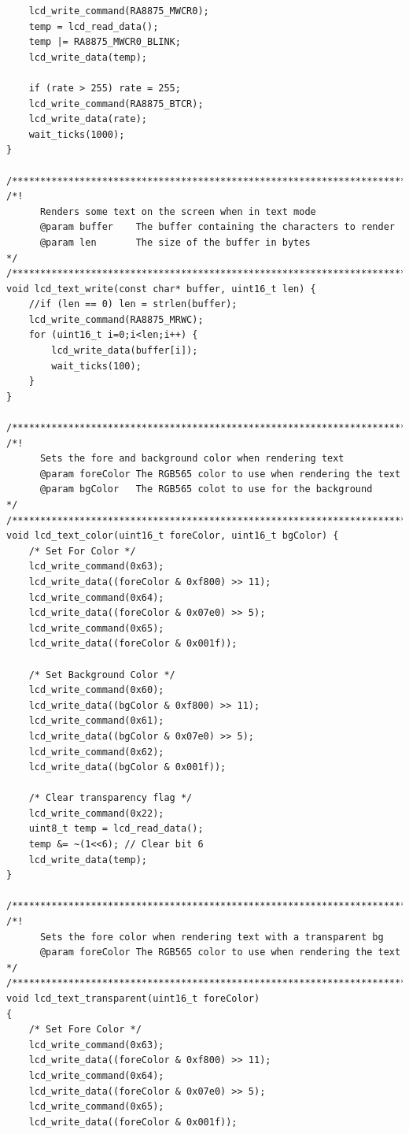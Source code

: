 \documentclass[a4paper, 12pt]{article}
\begin{document}
\begin{verbatim}
	lcd_write_command(RA8875_MWCR0);
	temp = lcd_read_data();
	temp |= RA8875_MWCR0_BLINK;
	lcd_write_data(temp);

	if (rate > 255) rate = 255;
	lcd_write_command(RA8875_BTCR);
	lcd_write_data(rate);
	wait_ticks(1000);
}

/**************************************************************************/
/*!
      Renders some text on the screen when in text mode
      @param buffer    The buffer containing the characters to render
      @param len       The size of the buffer in bytes
*/
/**************************************************************************/
void lcd_text_write(const char* buffer, uint16_t len) {
	//if (len == 0) len = strlen(buffer);
	lcd_write_command(RA8875_MRWC);
	for (uint16_t i=0;i<len;i++) {
		lcd_write_data(buffer[i]);
		wait_ticks(100);
	}
}

/**************************************************************************/
/*!
      Sets the fore and background color when rendering text
      @param foreColor The RGB565 color to use when rendering the text
      @param bgColor   The RGB565 colot to use for the background
*/
/**************************************************************************/
void lcd_text_color(uint16_t foreColor, uint16_t bgColor) {
	/* Set For Color */
	lcd_write_command(0x63);
	lcd_write_data((foreColor & 0xf800) >> 11);
	lcd_write_command(0x64);
	lcd_write_data((foreColor & 0x07e0) >> 5);
	lcd_write_command(0x65);
	lcd_write_data((foreColor & 0x001f));

	/* Set Background Color */
	lcd_write_command(0x60);
	lcd_write_data((bgColor & 0xf800) >> 11);
	lcd_write_command(0x61);
	lcd_write_data((bgColor & 0x07e0) >> 5);
	lcd_write_command(0x62);
	lcd_write_data((bgColor & 0x001f));

	/* Clear transparency flag */
	lcd_write_command(0x22);
	uint8_t temp = lcd_read_data();
	temp &= ~(1<<6); // Clear bit 6
	lcd_write_data(temp);
}

/**************************************************************************/
/*!
      Sets the fore color when rendering text with a transparent bg
      @param foreColor The RGB565 color to use when rendering the text
*/
/**************************************************************************/
void lcd_text_transparent(uint16_t foreColor)
{
	/* Set Fore Color */
	lcd_write_command(0x63);
	lcd_write_data((foreColor & 0xf800) >> 11);
	lcd_write_command(0x64);
	lcd_write_data((foreColor & 0x07e0) >> 5);
	lcd_write_command(0x65);
	lcd_write_data((foreColor & 0x001f));


\end{verbatim}
\end{document}
